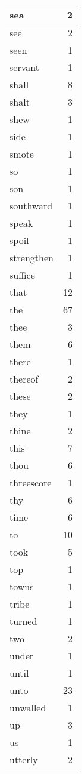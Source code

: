 \begin{center}
\begin{longtable}{l|r}
sea & 2 \\ \hline
see & 2 \\ \hline
seen & 1 \\ \hline
servant & 1 \\ \hline
shall & 8 \\ \hline
shalt & 3 \\ \hline
shew & 1 \\ \hline
side & 1 \\ \hline
smote & 1 \\ \hline
so & 1 \\ \hline
son & 1 \\ \hline
southward & 1 \\ \hline
speak & 1 \\ \hline
spoil & 1 \\ \hline
strengthen & 1 \\ \hline
suffice & 1 \\ \hline
that & 12 \\ \hline
the & 67 \\ \hline
thee & 3 \\ \hline
them & 6 \\ \hline
there & 1 \\ \hline
thereof & 2 \\ \hline
these & 2 \\ \hline
they & 1 \\ \hline
thine & 2 \\ \hline
this & 7 \\ \hline
thou & 6 \\ \hline
threescore & 1 \\ \hline
thy & 6 \\ \hline
time & 6 \\ \hline
to & 10 \\ \hline
took & 5 \\ \hline
top & 1 \\ \hline
towns & 1 \\ \hline
tribe & 1 \\ \hline
turned & 1 \\ \hline
two & 2 \\ \hline
under & 1 \\ \hline
until & 1 \\ \hline
unto & 23 \\ \hline
unwalled & 1 \\ \hline
up & 3 \\ \hline
us & 1 \\ \hline
utterly & 2 \\ \hline

\end{longtable}
\end{center}

